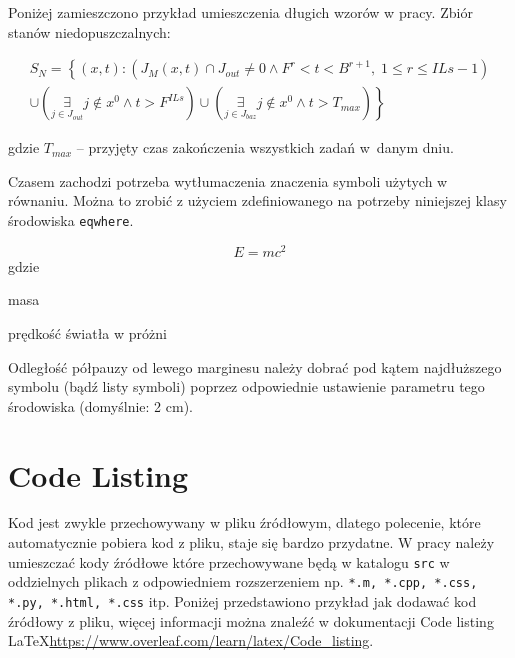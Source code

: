 Poniżej zamieszczono przykład umieszczenia długich wzorów w pracy. Zbiór stanów niedopuszczalnych:

\begin{equation}
    \begin{aligned}
        S_{N} = \left\{ \left( x,t \right): \left( J_{M}\left( x,t \right) \cap J_{out} \neq 0 \wedge F^{r} < t < B^{r+1}, \; 1 \leqslant r \leqslant ILs-1 \right) \right. \\
        \left. \cup \left( \underset{j \in J_{out} }{\exists} j \notin x^{0} \wedge t > F^{ILs} \right) \cup \left( \underset{j \in J_{baz} }{\exists} j \notin x^{0} \wedge t > T_{max} \right) \right\}
    \end{aligned}
    \label{eq:0028}
\end{equation}

\noindent gdzie $T_{max}$ -- przyjęty czas zakończenia wszystkich zadań w~danym dniu.

Czasem zachodzi potrzeba wytłumaczenia znaczenia symboli użytych w równaniu. Można to zrobić z użyciem zdefiniowanego na potrzeby niniejszej klasy środowiska \texttt{eqwhere}.

\begin{equation}
    E = mc^2
\end{equation}
gdzie
\begin{eqwhere}[2cm]
    \item[$m$] masa
    \item[$c$] prędkość światła w próżni
\end{eqwhere}

Odległość półpauzy od lewego marginesu należy dobrać pod kątem najdłuższego symbolu (bądź listy symboli) poprzez odpowiednie ustawienie parametru tego środowiska (domyślnie: 2 cm).

\section{Code Listing}

Kod jest zwykle przechowywany w pliku źródłowym, dlatego polecenie, które automatycznie pobiera kod z pliku, staje się bardzo przydatne. W pracy należy umieszczać kody źródłowe które przechowywane będą w katalogu \texttt{src} w oddzielnych plikach z odpowiedniem rozszerzeniem np. \texttt{*.m, *.cpp, *.css, *.py, *.html, *.css} itp. Poniżej przedstawiono przykład jak dodawać kod źródłowy z pliku, więcej informacji można znaleźć w dokumentacji Code listing \LaTeX  \url{https://www.overleaf.com/learn/latex/Code_listing}.

